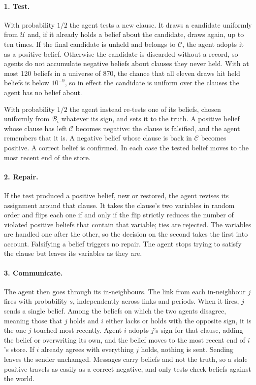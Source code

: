 \documentclass[11pt]{article}
\begin{document}
\paragraph{1. Test.} With probability $1/2$ the agent tests a new clause. It draws a candidate uniformly from $\mathcal{U}$ and, if it already holds a belief about the candidate, draws again, up to ten times. If the final candidate is unheld and belongs to $\mathcal{C}$, the agent adopts it as a positive belief. Otherwise the candidate is discarded without a record, so agents do not accumulate negative beliefs about clauses they never held. With at most 120 beliefs in a universe of 870, the chance that all eleven draws hit held beliefs is below $10^{-9}$, so in effect the candidate is uniform over the clauses the agent has no belief about.

With probability $1/2$ the agent instead re-tests one of its beliefs, chosen uniformly from $\mathcal{B}_i$ whatever its sign, and sets it to the truth. A positive belief whose clause has left $\mathcal{C}$ becomes negative: the clause is falsified, and the agent remembers that it is. A negative belief whose clause is back in $\mathcal{C}$ becomes positive. A correct belief is confirmed. In each case the tested belief moves to the most recent end of the store.

\paragraph{2. Repair.} If the test produced a positive belief, new or restored, the agent revises its assignment around that clause. It takes the clause's two variables in random order and flips each one if and only if the flip strictly reduces the number of violated positive beliefs that contain that variable; ties are rejected. The variables are handled one after the other, so the decision on the second takes the first into account. Falsifying a belief triggers no repair. The agent stops trying to satisfy the clause but leaves its variables as they are.

\paragraph{3. Communicate.} The agent then goes through its in-neighbours. The link from each in-neighbour $j$ fires with probability $s$, independently across links and periods. When it fires, $j$ sends a single belief. Among the beliefs on which the two agents disagree, meaning those that $j$ holds and $i$ either lacks or holds with the opposite sign, it is the one $j$ touched most recently. Agent $i$ adopts $j$'s sign for that clause, adding the belief or overwriting its own, and the belief moves to the most recent end of $i$'s store. If $i$ already agrees with everything $j$ holds, nothing is sent. Sending leaves the sender unchanged. Messages carry beliefs and not the truth, so a stale positive travels as easily as a correct negative, and only tests check beliefs against the world.
\end{document}
